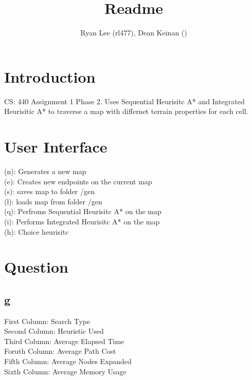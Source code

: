 \documentclass[a4paper]{article}
\title{Readme}
\author{Ryan Lee (rl477), Dean Keinan ()}
\begin{document}
\maketitle

\section{Introduction}

CS: 440 Assignment 1 Phase 2. Uses Sequential Heurisitc A* and Integrated Heurisitic A* to traverse a map with differnet terrain properties for each cell.

\section{User Interface}

(n): Generates a new map\\
(e): Creates new endpoints on the current map\\
(s): saves map to folder /gen\\
(l): loads map from folder /gen\\
(q): Perfroms Sequential Heurisitc A* on the map\\
(i): Performs Integrated Heurisitc A* on the map\\
(h): Choice heurisitc

\section{Question}

\subsection{g}

First Column: Search Type\\
Second Column: Heuristic Used\\
Third Column: Average Elapsed Time\\
Foruth Column: Average Path Cost\\
Fifth Column: Average Nodes Expanded\\
Sixth Column: Average Memory Usage\\
\end{document}
